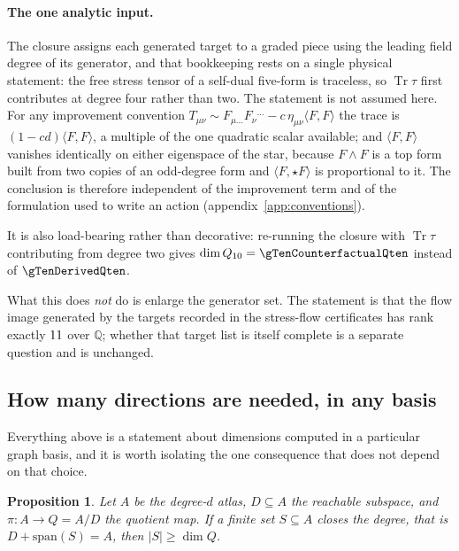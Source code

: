 \documentclass[11pt,a4paper]{article}
\newtheorem{proposition}{Proposition}
\begin{document}
\paragraph{The one analytic input.} The closure assigns each generated target
to a graded piece using the leading field degree of its generator, and that
bookkeeping rests on a single physical statement: the free stress tensor of a
self-dual five-form is traceless, so $\operatorname{Tr}\tau$ first contributes
at degree four rather than two. The statement is not assumed here. For any
improvement convention
$T_{\mu\nu} \sim F_{\mu\ldots}F_\nu{}^{\ldots}
 - c\,\eta_{\mu\nu}\langle F,F\rangle$
the trace is $(1-cd)\langle F,F\rangle$, a multiple of the one quadratic scalar
available; and $\langle F,F\rangle$ vanishes identically on either eigenspace of
the star, because $F\wedge F$ is a top form built from two copies of an
odd-degree form and $\langle F,\star F\rangle$ is proportional to it. The
conclusion is therefore independent of the improvement term and of the
formulation used to write an action (appendix~\ref{app:conventions}).

It is also load-bearing rather than decorative: re-running the closure with
$\operatorname{Tr}\tau$ contributing from degree two gives
$\dim Q_{10} = \gTenCounterfactualQten$ instead of $\gTenDerivedQten$.

What this does \emph{not} do is enlarge the generator set. The statement is that
the flow image generated by the targets recorded in the stress-flow certificates
has rank exactly $11$ over $\mathbb{Q}$; whether that target list is
itself complete is a separate question and is unchanged.

\subsection{How many directions are needed, in any basis}
\label{sec:cardinality}

Everything above is a statement about dimensions computed in a particular graph
basis, and it is worth isolating the one consequence that does not depend on that
choice.

\begin{proposition}
\label{prop:cardinality}
Let $A$ be the degree-$d$ atlas, $D\subseteq A$ the reachable subspace, and
$\pi : A \to Q = A/D$ the quotient map. If a finite set $S\subseteq A$ closes the
degree, that is $D + \mathrm{span}(S) = A$, then $|S| \ge \dim Q$.
\end{proposition}
\end{document}
